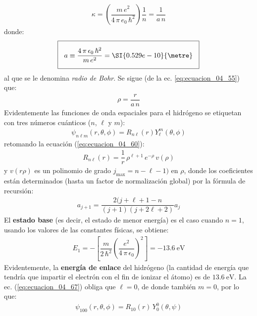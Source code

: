 \begin{align}
\kappa = \left( \dfrac{m \, e^{2}}{4 \, \pi \, e_{0} \, \hbar^{2}} \right) \dfrac{1}{n} = \dfrac{1}{a \, n}
\label{eq:ecuacion_04_71}
\end{align}
donde:
\begin{align}
\setlength{\fboxsep}{3\fboxsep}\boxed{
a \equiv \dfrac{4 \, \pi \, \epsilon_{0} \, \hbar^{2}}{m \, e^{2}} = \SI{0.529e-10}{\metre}}
\label{eq:ecuacion_04_72}
\end{align}
al que se le denomina \emph{radio de Bohr}. Se sigue (de la ec. \ref{eq:ecuacion_04_55}) que:
\begin{align}
\rho = \dfrac{r}{a \, n}
\label{eq:ecuacion_04_73}
\end{align}
Evidentemente las funciones de onda espaciales para el hidrógeno se etiquetan con tres números cuánticos ($n$, $\ell$ y $m$):
\begin{align}
\psi_{n \ell m} (r, \theta, \phi) =  R_{n \ell} (r) Y_{\ell}^{m} (\theta, \phi)
\label{eq:ecuacion_04_74}
\end{align}
retomando la ecuación (\ref{eq:ecuacion_04_60}):
\begin{align}
R_{n \ell}(r) = \dfrac{1}{r} \, \rho^{\ell + 1} \, e^{-\rho} \, v(\rho)
\label{eq:ecuacion_04_75}
\end{align}
y $v(r\rho)$ es un polinomio de grado $j_{\text{max}} = n - \ell - 1)$ en $\rho$, donde los coeficientes están determinados (hasta un factor de normalización global) por la fórmula de recursión:
\begin{align}
a_{j+1} = \dfrac{2 (j + \ell + 1 - n}{(j + 1)(j + 2 \ell + 2)} a_{j}
\label{eq:ecuacion_04_76}
\end{align}
El \textbf{estado base} (es decir, el estado de menor energía) es el caso cuando $n = 1$, usando los valores de las constantes físicas, se obtiene:
\begin{align}
E_{1} = - \left[ \dfrac{m}{2 \, \hbar^{2}} \left( \dfrac{e^{2}}{4 \, \pi \, \epsilon_{0}} \right)^{2} \right] =  \SI{-13.6}{\electronvolt}
\label{eq:ecuacion_04_77}
\end{align}
Evidentemente, la \textbf{energía de enlace} del hidrógeno (la cantidad de energía que tendría que impartir el electrón con el fin de ionizar el átomo) es de $\SI{13.6}{\electronvolt}$. La ec. (\ref{eq:ecuacion_04_67}) obliga que $\ell = 0$, de donde también $m = 0$, por lo que:
\begin{align}
\psi_{100} (r, \theta, \phi) = R_{10}(r) \, Y_{0}^{0} (\theta, \psi)
\label{eq:ecuacion_04_78}
\end{align}
